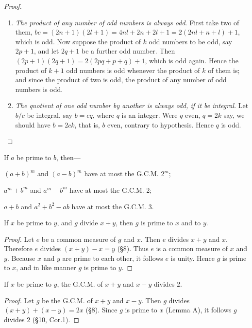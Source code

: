 \documentclass[DIN, pagenumber=false, fontsize=11pt, parskip=half]{scrartcl}
\begin{document}
\begin{problems}[from=1,step=1]
\begin{proof}
\begin{enumerate}
            \item \textit{The product of any number of odd numbers is always odd}. First take two of them, $bc = (2n+1)(2l+1) = 4nl + 2n + 2l + 1 = 2(2nl + n + l) + 1$, which is odd. Now suppose the product of $k$ odd numbers to be odd, say $2p + 1$, and let $2q + 1$ be a further odd number. Then $(2p+1)(2q+1) = 2(2pq + p + q) + 1$, which is odd again. Hence the product of $k+1$ odd numbers is odd whenever the product of $k$ of them is; and since the product of two is odd, the product of any number of odd numbers is odd.

            \item \textit{The quotient of one odd number by another is always odd, if it be integral}. Let $b/c$ be integral, say $b = cq$, where $q$ is an integer. Were $q$ even, $q = 2k$ say, we should have $b = 2ck$, that is, $b$ even, contrary to hypothesis. Hence $q$ is odd.
        \end{enumerate}
    \end{proof}


    \problem If $a$ be prime to $b$, then---
    \begin{parts}
        \item $(a+b)^m$ and $(a-b)^m$ have at most the G.C.M. $2^m$;
        \item $a^m + b^m$ and $a^m - b^m$ have at most the G.C.M. 2;
        \item $a+b$ and $a^2 + b^2 - ab$ have at most the G.C.M. 3.
    \end{parts}

    \begin{lemma*}[A]
        If $x$ be prime to $y$, and $g$ divide $x+y$, then $g$ is prime to $x$ and to $y$.
    \end{lemma*}
    \begin{proof}
        Let $e$ be a common measure of $g$ and $x$.
        Then $e$ divides $x+y$ and $x$. 
        Therefore $e$ divides $(x+y) - x = y$ (\S 8).
        Thus  $e$ is a common measure of $x$ and $y$.
        Because $x$ and $y$ are prime to each other, it follows $e$ is unity.
        Hence $g$ is prime to $x$, and in like manner $g$ is prime to $y$.
    \end{proof}

    \begin{lemma*}[B]
        If $x$ be prime to $y$, the G.C.M. of $x+y$ and $x-y$ divides $2$.
    \end{lemma*}
    \begin{proof}
        Let $g$ be the G.C.M. of $x+y$ and $x-y$.
        Then $g$ divides $(x+y) + (x-y) = 2x$ (\S 8).
        Since $g$ is prime to $x$ (Lemma A), it follows $g$ divides 2 (\S 10, Cor.1).
    \end{proof}


\end{problems}
\end{document}
